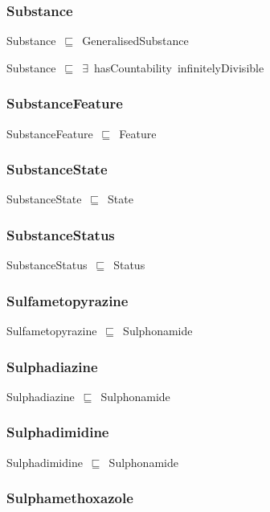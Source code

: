 \documentclass{article}
\begin{document}
\subsubsection*{Substance}

Substance~\ensuremath{\sqsubseteq}~GeneralisedSubstance~

Substance~\ensuremath{\sqsubseteq}~\ensuremath{\exists}~hasCountability~infinitelyDivisible~

\subsubsection*{SubstanceFeature}

SubstanceFeature~\ensuremath{\sqsubseteq}~Feature~

\subsubsection*{SubstanceState}

SubstanceState~\ensuremath{\sqsubseteq}~State~

\subsubsection*{SubstanceStatus}

SubstanceStatus~\ensuremath{\sqsubseteq}~Status~

\subsubsection*{Sulfametopyrazine}

Sulfametopyrazine~\ensuremath{\sqsubseteq}~Sulphonamide~

\subsubsection*{Sulphadiazine}

Sulphadiazine~\ensuremath{\sqsubseteq}~Sulphonamide~

\subsubsection*{Sulphadimidine}

Sulphadimidine~\ensuremath{\sqsubseteq}~Sulphonamide~

\subsubsection*{Sulphamethoxazole}
\end{document}
